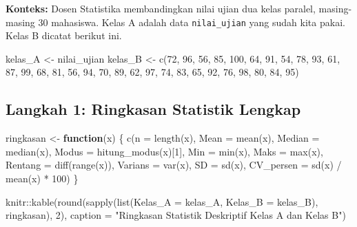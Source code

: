 \documentclass[
  indonesian,
  letterpaper,
]{book}
\newenvironment{Shaded}{\begin{snugshade}}{\end{snugshade}}
\newcommand{\AttributeTok}[1]{\textcolor[rgb]{0.40,0.45,0.13}{#1}}
\newcommand{\ControlFlowTok}[1]{\textcolor[rgb]{0.00,0.23,0.31}{\textbf{#1}}}
\newcommand{\DecValTok}[1]{\textcolor[rgb]{0.68,0.00,0.00}{#1}}
\newcommand{\FunctionTok}[1]{\textcolor[rgb]{0.28,0.35,0.67}{#1}}
\newcommand{\NormalTok}[1]{\textcolor[rgb]{0.00,0.23,0.31}{#1}}
\newcommand{\OtherTok}[1]{\textcolor[rgb]{0.00,0.23,0.31}{#1}}
\newcommand{\SpecialCharTok}[1]{\textcolor[rgb]{0.37,0.37,0.37}{#1}}
\newcommand{\StringTok}[1]{\textcolor[rgb]{0.13,0.47,0.30}{#1}}
\begin{document}
\textbf{Konteks:} Dosen Statistika membandingkan nilai ujian dua kelas
paralel, masing-masing 30 mahasiswa. Kelas A adalah data
\texttt{nilai\_ujian} yang sudah kita pakai. Kelas B dicatat berikut
ini.

\begin{Shaded}
\begin{Highlighting}[]
\NormalTok{kelas\_A }\OtherTok{\textless{}{-}}\NormalTok{ nilai\_ujian}
\NormalTok{kelas\_B }\OtherTok{\textless{}{-}} \FunctionTok{c}\NormalTok{(}\DecValTok{72}\NormalTok{, }\DecValTok{96}\NormalTok{, }\DecValTok{56}\NormalTok{, }\DecValTok{85}\NormalTok{, }\DecValTok{100}\NormalTok{, }\DecValTok{64}\NormalTok{, }\DecValTok{91}\NormalTok{, }\DecValTok{54}\NormalTok{, }\DecValTok{78}\NormalTok{, }\DecValTok{93}\NormalTok{,}
\DecValTok{61}\NormalTok{, }\DecValTok{87}\NormalTok{, }\DecValTok{99}\NormalTok{, }\DecValTok{68}\NormalTok{, }\DecValTok{81}\NormalTok{, }\DecValTok{56}\NormalTok{, }\DecValTok{94}\NormalTok{, }\DecValTok{70}\NormalTok{, }\DecValTok{89}\NormalTok{, }\DecValTok{62}\NormalTok{,}
\DecValTok{97}\NormalTok{, }\DecValTok{74}\NormalTok{, }\DecValTok{83}\NormalTok{, }\DecValTok{65}\NormalTok{, }\DecValTok{92}\NormalTok{, }\DecValTok{76}\NormalTok{, }\DecValTok{98}\NormalTok{, }\DecValTok{80}\NormalTok{, }\DecValTok{84}\NormalTok{, }\DecValTok{95}\NormalTok{)}
\end{Highlighting}
\end{Shaded}

\subsection{Langkah 1: Ringkasan Statistik
Lengkap}\label{langkah-1-ringkasan-statistik-lengkap}

\begin{Shaded}
\begin{Highlighting}[]
\NormalTok{ringkasan }\OtherTok{\textless{}{-}} \ControlFlowTok{function}\NormalTok{(x) \{}
\FunctionTok{c}\NormalTok{(}\AttributeTok{n =} \FunctionTok{length}\NormalTok{(x), }\AttributeTok{Mean =} \FunctionTok{mean}\NormalTok{(x), }\AttributeTok{Median =} \FunctionTok{median}\NormalTok{(x),}
\AttributeTok{Modus =} \FunctionTok{hitung\_modus}\NormalTok{(x)[}\DecValTok{1}\NormalTok{],}
\AttributeTok{Min =} \FunctionTok{min}\NormalTok{(x), }\AttributeTok{Maks =} \FunctionTok{max}\NormalTok{(x), }\AttributeTok{Rentang =} \FunctionTok{diff}\NormalTok{(}\FunctionTok{range}\NormalTok{(x)),}
\AttributeTok{Varians =} \FunctionTok{var}\NormalTok{(x), }\AttributeTok{SD =} \FunctionTok{sd}\NormalTok{(x), }\AttributeTok{CV\_persen =} \FunctionTok{sd}\NormalTok{(x) }\SpecialCharTok{/} \FunctionTok{mean}\NormalTok{(x) }\SpecialCharTok{*} \DecValTok{100}\NormalTok{)}
\NormalTok{\}}

\NormalTok{knitr}\SpecialCharTok{::}\FunctionTok{kable}\NormalTok{(}\FunctionTok{round}\NormalTok{(}\FunctionTok{sapply}\NormalTok{(}\FunctionTok{list}\NormalTok{(}\AttributeTok{Kelas\_A =}\NormalTok{ kelas\_A, }\AttributeTok{Kelas\_B =}\NormalTok{ kelas\_B), ringkasan), }\DecValTok{2}\NormalTok{),}
\AttributeTok{caption =} \StringTok{"Ringkasan Statistik Deskriptif Kelas A dan Kelas B"}\NormalTok{)}
\end{Highlighting}
\end{Shaded}
\end{document}
